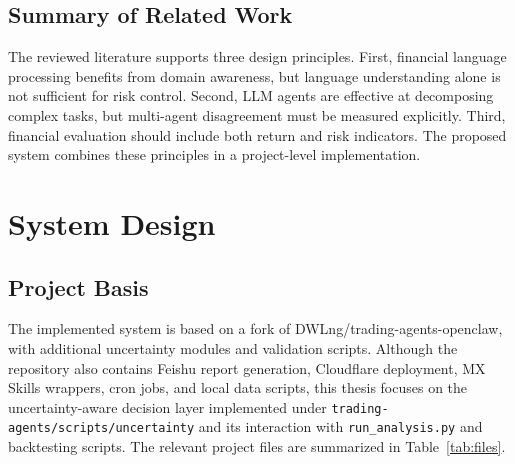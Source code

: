 \documentclass[14pt,a4paper]{extarticle}
\begin{document}
\subsection{Summary of Related Work}

The reviewed literature supports three design principles. First, financial language processing benefits from domain awareness, but language understanding alone is not sufficient for risk control. Second, LLM agents are effective at decomposing complex tasks, but multi-agent disagreement must be measured explicitly. Third, financial evaluation should include both return and risk indicators. The proposed system combines these principles in a project-level implementation.

\section{System Design}

\subsection{Project Basis}

The implemented system is based on a fork of DWLng/trading-agents-openclaw, with additional uncertainty modules and validation scripts. Although the repository also contains Feishu report generation, Cloudflare deployment, MX Skills wrappers, cron jobs, and local data scripts, this thesis focuses on the uncertainty-aware decision layer implemented under \texttt{trading-agents/scripts/uncertainty} and its interaction with \texttt{run\_analysis.py} and backtesting scripts. The relevant project files are summarized in Table~\ref{tab:files}.
\end{document}
